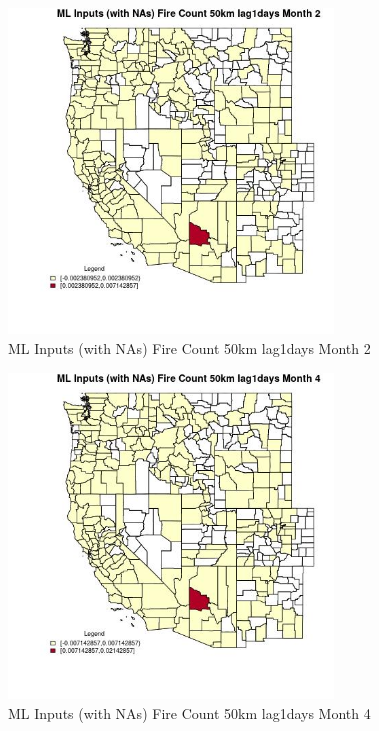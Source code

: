 \begin{figure} 
\centering  
\includegraphics[width=0.77\textwidth]{Code_Outputs/Report_ML_input_PM25_Step4_part_e_de_duplicated_aves_compiled_2019-05-21wNAs_CountyFire_Count_50km_lag1daysmedianMonth2.jpg} 
\caption{\label{fig:Report_ML_input_PM25_Step4_part_e_de_duplicated_aves_compiled_2019-05-21wNAsCountyFire_Count_50km_lag1daysmedianMonth2}ML Inputs (with NAs) Fire Count 50km lag1days Month 2} 
\end{figure} 
 

\begin{figure} 
\centering  
\includegraphics[width=0.77\textwidth]{Code_Outputs/Report_ML_input_PM25_Step4_part_e_de_duplicated_aves_compiled_2019-05-21wNAs_CountyFire_Count_50km_lag1daysmedianMonth4.jpg} 
\caption{\label{fig:Report_ML_input_PM25_Step4_part_e_de_duplicated_aves_compiled_2019-05-21wNAsCountyFire_Count_50km_lag1daysmedianMonth4}ML Inputs (with NAs) Fire Count 50km lag1days Month 4} 
\end{figure} 
 

